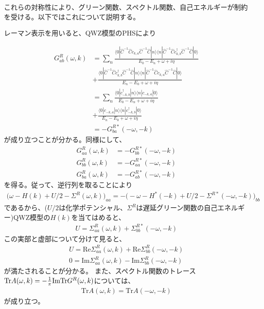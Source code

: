 \documentclass[12pt]{jsbook}
\newcommand{\la}{\langle}
\newcommand{\ra}{\rangle}
\newcommand{\ca}{c_{k,a}}
\newcommand{\cbd}{c_{k,b}^{\dagger}}
\newcommand{\cma}{c_{-k,a}}
\newcommand{\cbmd}{c_{-k,b}^{\dagger}}
\newcommand{\Ch}{\hat{C}}
\begin{document}
 これらの対称性により、グリーン関数、スペクトル関数、自己エネルギーが制約を受ける。以下ではこれについて説明する。

レーマン表示を用いると、QWZ模型のPHSにより 

\begin{align} 
G^R_{ab}(\omega,k) &= \displaystyle \sum_n \frac{\la 0|\Ch^{-1}\Ch\ca \Ch^{-1}\Ch |n\ra \la n|\Ch^{-1}\Ch \cbd \Ch^{-1}\Ch| 0\ra}{E_0-E_n + \omega + i\eta } \\
&+ \frac{\la 0|\Ch^{-1}\Ch\cbd \Ch^{-1}\Ch|n\ra \la n|\Ch^{-1}\Ch \ca \Ch^{-1}\Ch|0\ra}{E_n - E_0 + \omega + i\eta}\\ 
&=\displaystyle \sum_n \frac{\la 0|\cbmd |n\ra \la n| \cma | 0\ra}{E_0-E_n + \omega + i\eta } \\
&+ \frac{\la 0|\cma |n\ra \la n| \cbmd |0\ra}{E_n - E_0 + \omega + i\eta}\\
&=-G^{R*}_{ba}(-\omega,-k)
\end{align} 
が成り立つことが分かる。同様にして、
\begin{align} G^R_{aa}(\omega,k) &=-G^{R*}_{bb}(-\omega,-k)\\
G^R_{bb}(\omega,k) &=-G^{R*}_{aa}(-\omega,-k)\\
G^R_{ba}(\omega,k) &=-G^{R*}_{ab}(-\omega,-k)
\end{align} 
を得る。従って、逆行列を取ることにより
\begin{align}
\Big( \omega-H(k)+U/2-\Sigma^R(\omega,k)\Big)_{aa}=-\Big(-\omega-H^{*}(-k)+U/2-\Sigma^{R*}(-\omega,-k)\Big)_{bb} 
\end{align}  
であるから、($U/2$は化学ポテンシャル、$\Sigma^R$は遅延グリーン関数の自己エネルギー)QWZ模型の$H(k)$を当てはめると、
\begin{eqnarray}
U=\Sigma^{R}_{aa}(\omega,k)+\Sigma^{R*}_{bb}(-\omega,-k)
\end{eqnarray}
この実部と虚部について分けて見ると、
\begin{eqnarray}
    U=\mathrm{Re} \Sigma^{R}_{aa}(\omega,k)+\mathrm{Re} \Sigma^{R}_{bb}(-\omega,-k)\\
    0 = \mathrm{Im}\Sigma^{R}_{aa}(\omega,k)-\mathrm{Im}\Sigma^{R}_{bb}(-\omega,-k)
\end{eqnarray}
が満たされることが分かる。
また、スペクトル関数のトレース$\mathrm{Tr}A(\omega,k) =-{1\over\pi}\mathrm{ImTr}G^R(\omega,k)$については、 
\begin{eqnarray}
    \mathrm{Tr}A(\omega,k)=\mathrm{Tr}A(-\omega,-k)
\end{eqnarray}  
が成り立つ。
\end{document}
